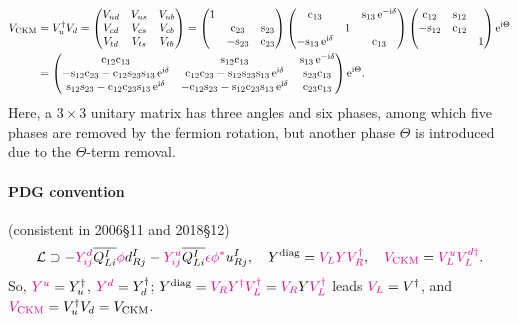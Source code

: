 \documentclass[CheatSheet]{subfiles}
\begin{document}
\begin{equation}
\begin{split}
  V\w{CKM}&=V_u^\dagger V_d
 =\pmat{
 V_{ud} & V_{us} & V_{ub}\\
 V_{cd} & V_{cs} & V_{cb}\\
 V_{td} & V_{ts} & V_{tb}
 }
 =
%
 \pmat{1&&\\&\co{23}&\si{23}\\&-\si{23}&\co{23}}
 \pmat{\co{13}&&\si{13}\ee^{-\ii\delta}\\&1&\\-\si{13}\ee^{\ii\delta}&&\co{13}}
 \pmat{\co{12}&\si{12}&\\-\si{12}&\co{12}&\\&&1}\ee^{\ii\Theta}
%
 \\&=
 \pmat{
 \co{12} \co{13} & \si{12} \co{13} & \si{13} \ee^{-\ii\delta}\\
 -\si{12} \co{23} - \co{12} \si{23} \si{13} \ee^{\ii\delta}& \co{12} \co{23} - \si{12}\si{23}\si{13} \ee^{\ii\delta}& \si{23}\co{13}\\
  \si{12}\si{23} - \co{12} \co{23} \si{13}\ee^{\ii\delta} & -\co{12}\si{23}-\si{12}\co{23}\si{13}\ee^{\ii\delta} & \co{23} \co{13}
 }\ee^{\ii\Theta}.
\end{split}
\end{equation}
Here, a $3\times3$ unitary matrix has three angles and six phases, among which five phases are removed by the fermion rotation, but another phase $\Theta$ is introduced due to the $\Theta$-term removal.

\paragraph{PDG convention} (consistent in 2006\S11 and 2018\S12)
\begin{equation}
 \mathcal L \supset
 -{\color{magenta}Y^d_{ij}}\overline{Q_{Li}^I}{\color{magenta}\phi} d_{Rj}^I
 -{\color{magenta}Y^u_{ij}}\overline{Q_{Li}^I}{\color{magenta}\epsilon\phi^*}u_{Rj}^I,
\quad Y^{\mathrm{diag}} = {\color{magenta}V_L Y V_R^\dagger},
\quad {\color{magenta}V_{\mathrm{CKM}}} = {\color{magenta}V^u_LV_L^{d\dagger}}.
\end{equation}
So, ${\color{magenta}Y^u}=Y_{u}^\dagger$, ${\color{magenta}Y^d}=Y_{d}^\dagger$;
$Y^{\mathrm{diag}} = {\color{magenta}V_RY^\dagger V_L^\dagger} = {\color{magenta}V_R}Y{\color{magenta}V_L^\dagger}$ leads ${\color{magenta}V_L}=V^\dagger$, and
${\color{magenta}V_{\mathrm{CKM}}}=V_u^\dagger V_d=V_{\mathrm{CKM}}$.
\end{document}
